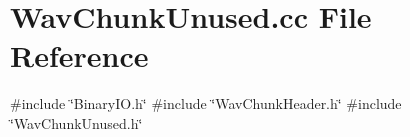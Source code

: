\section{Wav\+Chunk\+Unused.\+cc File Reference}
\label{WavChunkUnused_8cc}
{\ttfamily \#include \char`\"{}Binary\+I\+O.\+h\char`\"{}}\newline
{\ttfamily \#include \char`\"{}Wav\+Chunk\+Header.\+h\char`\"{}}\newline
{\ttfamily \#include \char`\"{}Wav\+Chunk\+Unused.\+h\char`\"{}}\newline
